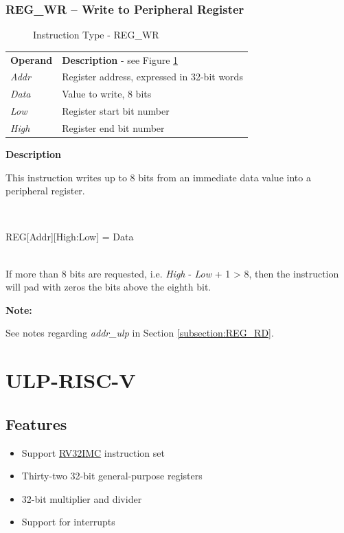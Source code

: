 \documentclass[main\_\_EN.tex]{subfiles}
\begin{document}
\subsubsection{REG\_WR – Write to Peripheral Register} \label{subsection:REG_WR}

%
%
%
%
%
\begin{figure}[!ht ]
    \centering
    \caption{Instruction Type - REG\_WR}
    \label{figure:REG_WR}
\end{figure}


\begin{tabular}{ l l }
\textbf{Operand} & \textbf{Description} - see Figure  \ref{figure:REG_WR} \\
\textit{Addr} & Register address, expressed in 32-bit words \\
\textit{Data} & Value to write, 8 bits \\
\textit{Low} & Register start bit number  \\
\textit{High} & Register end bit number \\
\end{tabular}

\textbf{Description}

This instruction writes up to 8 bits from an immediate data value into a peripheral register.

~
\begin{centering}
    REG[Addr][High:Low] = Data \\
\end{centering}
~\\
If more than 8 bits are requested, i.e. \textit{High} - \textit{Low} + 1 > 8, then the instruction will pad with zeros the bits above the eighth bit.

\textbf{Note:}

See notes regarding \textit{addr\_ulp} in Section \ref{subsection:REG_RD}.

\section{ULP-RISC-V} \label{subsection:PicoRV32}
\subsection{Features}

\begin{itemize}
    \item Support \href{https://riscv.org/specifications/}{RV32IMC} instruction set
    \item Thirty-two 32-bit general-purpose registers
    \item 32-bit multiplier and divider
    \item Support for interrupts
\end{itemize}
\end{document}
